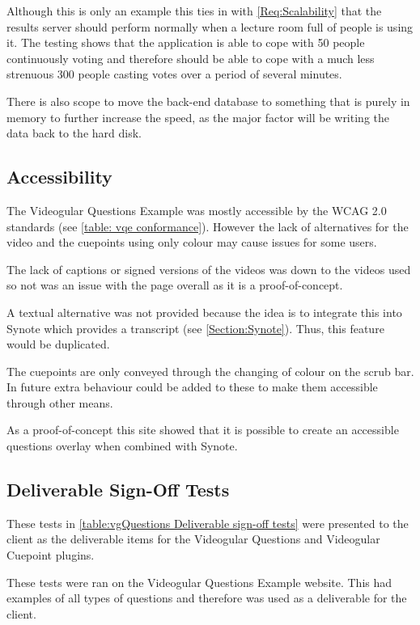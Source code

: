 Although this is only an example this ties in with \cref{Req:Scalability} that the results server should perform normally when a lecture room full of people is using it. The testing shows that the application is able to cope with 50 people continuously voting and therefore should be able to cope with a much less strenuous 300 people casting votes over a period of several minutes.

There is also scope to move the back-end database to something that is purely in memory to further increase the speed, as the major factor will be writing the data back to the hard disk.

\subsection{Accessibility}
\label{Subsection: vqe accessibility}

The \gls{Videogular} Questions Example was mostly accessible by the WCAG 2.0 standards (see \autoref{table: vqe conformance}). However the lack of alternatives for the video and the cuepoints using only colour may cause issues for some users.

The lack of captions or signed versions of the videos was down to the videos used so not was an issue with the page overall as it is a proof-of-concept.

A textual alternative was not provided because the idea is to integrate this into Synote which provides a transcript (see \autoref{Section:Synote}). Thus, this feature would be duplicated.

The cuepoints are only conveyed through the changing of colour on the scrub bar. In future extra behaviour could be added to these to make them accessible through other means.

As a proof-of-concept this site showed that it is possible to create an accessible questions overlay when combined with Synote.

\subsection{Deliverable Sign-Off Tests}

These tests in \autoref{table:vgQuestions Deliverable sign-off tests} were presented to the client as the deliverable items for the Videogular Questions and Videogular Cuepoint plugins.

These tests were ran on the Videogular Questions Example website. This had examples of all types of questions and therefore was used as a deliverable for the client.

